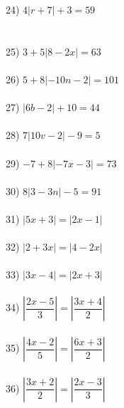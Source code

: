 \documentclass[12pt]{article}
\theoremstyle{definition}
\begin{document}
\begin{multicols}{3}
  24) $4 |r + 7| + 3 = 59$\\ \ \\ \ \\
  25) $3 + 5 |8 - 2 x| = 63$\\ \ \\
  26) $5 + 8| - 10 n - 2| = 101$\\ \ \\
  27) $|6b - 2| + 10 = 44$\\ \ \\
  28) $7 |10v - 2| - 9 = 5$\\ \ \\
  29) $- 7 + 8| - 7 x - 3| = 73$\\ \ \\
  30) $8 |3 - 3 n| - 5 = 91$\\ \ \\
  31) $|5x + 3| = |2x - 1|$\\ \ \\
	32) $| 2 + 3 x| = |4 - 2 x|$\\ \ \\
	33) $| 3 x - 4| = |2x + 3|$\\ \ \\
	34) $\left| \dfrac{2 x - 5}{3} \right| = \left| \dfrac{3 x + 4}{2} \right|$\\ \ \\
	35) $\left| \dfrac{4 x - 2}{5} \right| = \left| \dfrac{6 x + 3}{2} \right|$\\ \ \\
	36) $\left| \dfrac{3 x + 2}{2} \right| = \left| \dfrac{2 x - 3}{3} \right|$\\ \ \\
\end{multicols}
\newpage
\end{document}
